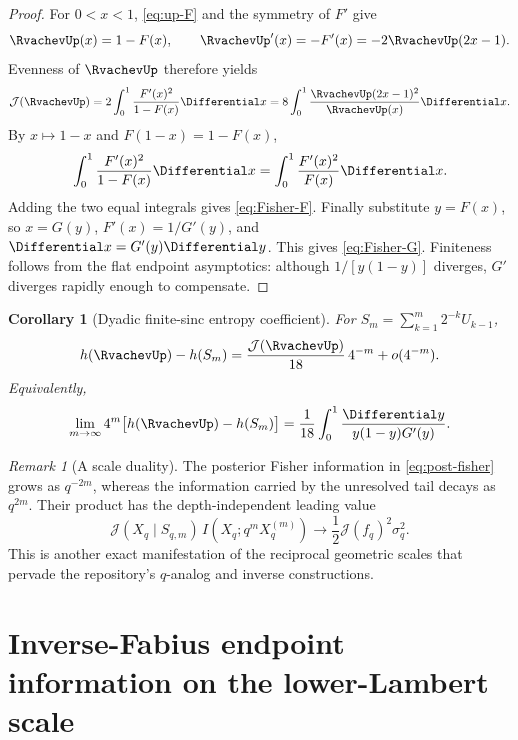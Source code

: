 \documentclass[11pt,oneside]{article}
\newtheorem{corollary}[theorem]{Corollary}
\theoremstyle{definition}
\theoremstyle{remark}
\newtheorem{remark}[theorem]{Remark}
\begin{document}
\begin{proof}
For $0<x<1$, \eqref{eq:up-F} and the symmetry of $F'$ give
\[
 \RvachevUp(x)=1-F(x),
 \qquad
 \RvachevUp'(x)=-F'(x)=-2\RvachevUp(2x-1).
\]
Evenness of $\RvachevUp$ therefore yields
\[
 \mathcal J(\RvachevUp)
 =2\int_0^1\frac{F'(x)^2}{1-F(x)}\Differential x
 =8\int_0^1\frac{\RvachevUp(2x-1)^2}{\RvachevUp(x)}\Differential x.
\]
By $x\mapsto1-x$ and $F(1-x)=1-F(x)$,
\[
 \int_0^1\frac{F'(x)^2}{1-F(x)}\Differential x
 =\int_0^1\frac{F'(x)^2}{F(x)}\Differential x.
\]
Adding the two equal integrals gives \eqref{eq:Fisher-F}.  Finally substitute
$y=F(x)$, so $x=G(y)$, $F'(x)=1/G'(y)$, and
$\Differential x=G'(y)\Differential y$.  This gives \eqref{eq:Fisher-G}.  Finiteness follows from the
flat endpoint asymptotics: although $1/[y(1-y)]$ diverges, $G'$ diverges rapidly
enough to compensate.
\end{proof}

\begin{corollary}[Dyadic finite-sinc entropy coefficient]
\label{cor:dyadic-fisher-gap}
For $S_m=\sum_{k=1}^m2^{-k}U_{k-1}$,
\begin{equation}
 h(\RvachevUp)-h(S_m)
 =\frac{\mathcal J(\RvachevUp)}{18}\,4^{-m}+o(4^{-m}).
 \label{eq:dyadic-fisher-gap}
\end{equation}
Equivalently,
\begin{equation}
 \lim_{m\to\infty}4^m\bigl[h(\RvachevUp)-h(S_m)\bigr]
 =\frac1{18}\int_0^1\frac{\Differential y}{y(1-y)G'(y)}.
 \label{eq:dyadic-fisher-G-limit}
\end{equation}
\end{corollary}

\begin{remark}[A scale duality]
The posterior Fisher information in \eqref{eq:post-fisher} grows as $q^{-2m}$,
whereas the information carried by the unresolved tail decays as $q^{2m}$.  Their
product has the depth-independent leading value
\begin{equation}
 \mathcal J(X_q\mid S_{q,m})\,
 I(X_q;q^mX_q^{(m)})
 \longrightarrow\frac12\mathcal J(f_q)^2\sigma_q^2.
 \label{eq:fisher-tail-duality}
\end{equation}
This is another exact manifestation of the reciprocal geometric scales that
pervade the repository's $q$-analog and inverse constructions.
\end{remark}

\section{Inverse-Fabius endpoint information on the lower-Lambert scale}
\label{sec:Lambert-entropy}
\end{document}
